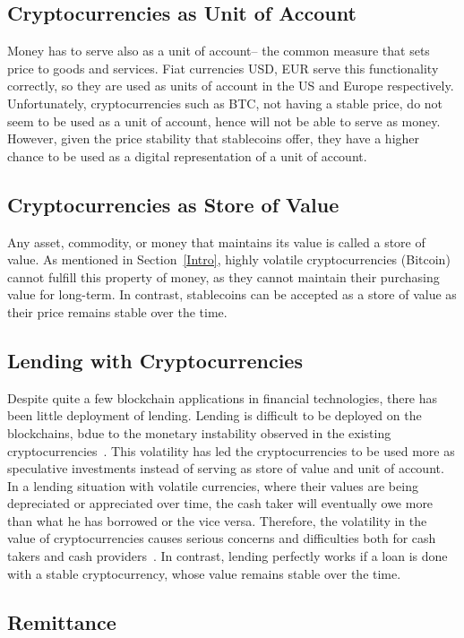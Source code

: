 \subsection{Cryptocurrencies as Unit of Account}
Money has to serve also as a unit of account-- the common measure that sets price to goods and services. Fiat currencies \eg USD, EUR \etc serve this functionality correctly, so they are used as units of account in the US and Europe respectively. Unfortunately, cryptocurrencies such as BTC, not having a stable price, do not seem to be used as a unit of account, hence will not be able to serve as money. However, given the price stability that stablecoins offer, they have a higher chance to be used as a digital representation of a unit of account.

\subsection{Cryptocurrencies as Store of Value}
Any asset, commodity, or money that maintains its value is called a store of value. As mentioned in Section~\ref{Intro}, highly volatile cryptocurrencies (\ie Bitcoin) cannot fulfill this property of money, as they cannot maintain their purchasing value for long-term. In contrast, stablecoins can be accepted as a store of value as their price remains stable over the time.

\subsection{Lending with Cryptocurrencies}
Despite quite a few blockchain applications in financial technologies, there has been little deployment of lending.
Lending is difficult to be deployed on the blockchains, bdue to the monetary instability observed in the existing cryptocurrencies~\cite{okoyetoward}. This volatility has led the cryptocurrencies to be used more as speculative investments instead of serving as store of value and unit of account. In a lending situation with volatile currencies, where their values are being depreciated or appreciated over time, the cash taker will eventually owe more than what he has borrowed or the vice versa. Therefore, the volatility in the value of cryptocurrencies causes serious concerns and difficulties both for cash takers and cash providers~\cite{okoyetoward}. In contrast, lending perfectly works if a loan is done with a stable cryptocurrency, whose value remains stable over the time.

\subsection{Remittance}

